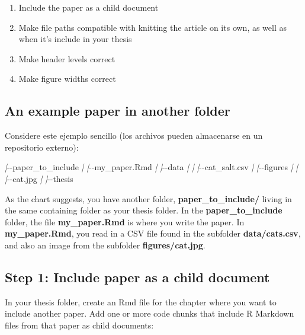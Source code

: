 \documentclass[a4paper, nobind]{templates/ociamthesis}
\providecommand{\tightlist}{%
  \setlength{\itemsep}{0pt}\setlength{\parskip}{0pt}}
\newenvironment{Shaded}{\begin{snugshade}}{\end{snugshade}}
\newcommand{\NormalTok}[1]{#1}
\newcommand{\PreprocessorTok}[1]{\textcolor[rgb]{0.56,0.35,0.01}{\textit{#1}}}
\renewenvironment{Shaded}
{
  \vspace{10pt}%
  \begin{snugshade}%
}{%
  \end{snugshade}%
  \vspace{8pt}%
}
\begin{document}
\begin{enumerate}
\def\labelenumi{\arabic{enumi}.}
\tightlist
\item
  Include the paper as a child document
\item
  Make file paths compatible with knitting the article on its own, as well as when it's include in your thesis
\item
  Make header levels correct
\item
  Make figure widths correct
\end{enumerate}

\subsection{An example paper in another folder}\label{an-example-paper-in-another-folder}

Considere este ejemplo sencillo (los archivos pueden almacenarse en un repositorio externo):

\begin{Shaded}
\begin{Highlighting}[]
\PreprocessorTok{|}\NormalTok{{-}{-}paper\_to\_include}
\PreprocessorTok{|}  \PreprocessorTok{|}\NormalTok{{-}{-}my\_paper.Rmd}
\PreprocessorTok{|}  \PreprocessorTok{|}\NormalTok{{-}{-}data}
\PreprocessorTok{|}  \PreprocessorTok{|}  \PreprocessorTok{|}\NormalTok{{-}{-}cat\_salt.csv}
\PreprocessorTok{|}  \PreprocessorTok{|}\NormalTok{{-}{-}figures}
\PreprocessorTok{|}  \PreprocessorTok{|}  \PreprocessorTok{|}\NormalTok{{-}{-}cat.jpg}
\PreprocessorTok{|}
\PreprocessorTok{|}\NormalTok{{-}{-}thesis}
\end{Highlighting}
\end{Shaded}

As the chart suggests, you have another folder, \textbf{paper\_to\_include/} living in the same containing folder as your thesis folder.
In the \textbf{paper\_to\_include} folder, the file \textbf{my\_paper.Rmd} is where you write the paper.
In \textbf{my\_paper.Rmd}, you read in a CSV file found in the subfolder \textbf{data/cats.csv}, and also an image from the subfolder \textbf{figures/cat.jpg}.

\subsection{Step 1: Include paper as a child document}\label{step-1-include-paper-as-a-child-document}

In your thesis folder, create an Rmd file for the chapter where you want to include another paper.
Add one or more code chunks that include R Markdown files from that paper as child documents:
\end{document}
